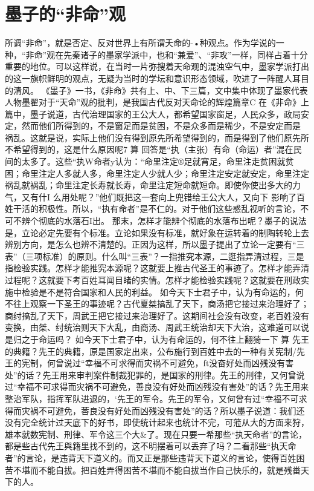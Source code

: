 {{\section{墨子的“非命”观	}
所调“非命”，就是否定、反对世界上有所谓夭命的-•种观点。作为学说的一种，“非命”观在先秦诸子的墨家学派中，也和“兼爱”、“非攻”一样，同样占着十分重要的地位。可以这样说，在当时一片弥搜着天命观的混浊空气中，墨家学派打出的这一旗帜鲜明的观点，无疑为当时的学坛和意识形态领域，吹进了一阵醒人耳目的清风。
《墨子》一书，《非命》共有上、中、下三篇，文中集中体现了墨家代表人物墨翟对于“天命”观的批判，是我国古代反对天命论的辉煌篇章C
在《非命》上篇中，墨子说道，古代治理国家的王公大人，都希望国家窗足，人民众多，政局安定，然而他们所得到的，不是窗足而是贫困，不是众多而是稀少，不是安定而是
祸乱。这就是说，实际上他们没有得到原先所希望得到的，而是得到了他们原先所不希望得到的，这是什么原因呢7
算
回答是“执（主张）有命（命运）者”混在民间的太多了。这些“执W命者y认为：“命里注定®足就宵足，命里注走贫困就贫困；命里注定人多就人多，命里注定人少就人少；命里注定安定就安定，命里注定祸乱就祸乱；命里注定长寿就长寿，命里注定短命就短命。即使你使出多大的力气，又有什I	么用处呢？”他们既把这一套向上兜错给王公大人，又向下
影响了百姓干活的积极性。所以，“执有命者”是不仁的。对于他们这些惑乱视听的言论，不可不辨个彻底的水落石I出。
那末，怎样才能辨个彻底的水落布出呢？墨子的说法是，立论必定先要有个标准。立论如果没有标准，就好象在运转着的制陶转轮上去辨别方向，是怎么也辨不清楚的。正因为这样，所以墨子提出了立论一定要有“三表”（三项标准）的原则。什么叫“三表”？一指推究本源，二逛指弄清过程，三是指检验实践。怎样才能推究本源呢？这就要上推古代圣王的事迹了。怎样才能弄清过程呢？这就要下考百姓耳闻目睹的实情。怎样才能检验实践呢？这就要在刑政实施中检验是不是符合国家和人民的利益。
如今天下士君子中，认为有命运的，何不往上观察一下圣王的事迹呢？古代夏桀搞乱了天下，商汤把它接过来治理好了；商纣搞乱了天下，周武王把它接过来治理好了。这期间社会没有改变，老百姓没有变换，由桀、纣统治则天下大乱，由商汤、周武王统治却天下大治，这难道可以说是归之于命运吗？
如今天下士君子中，认为有命运的，何不往上翻猗一下
算
先王的典籍？先王的典籍，原是国家定出来，公布施行到百姓中去的一种有关宪制/先王的宪制，何曾说过“幸福不可求得而灾祸不可避免，ft没奋好处而凶残没有害处”的话？先王用来审判案件制裁犯罪的，是国家的刑律。先王的刑律，又何曾说过“幸福不可求得而灾祸不可避免，善良没有好处而凶残没有害处”的话？先王用来整治军队，指挥军队进退的，‘先王的军令。先王的军令，又何曾有过“幸福不可求得而灾祸不可避免，莕良没有好处而凶残没有害处”的话？所以墨子说道：我们还没有完全统计过天底下的好书，即使统计起来也统计不完，可蒞从大的方面来狩，雄本就数宪制、刑律、军令这三个大&了。现在只要一希那些“执天命者”的言论，都是些古代先王與籍里找不到的，这不明摆着可以丢弃了吗？二看那些“执天命者”的言论，是违背天下道义的。而又正是那些违背天下道义的言论，使得百姓困苦不堪而不能自拔。把百姓弄得困苦不堪而不能自拔当作自己快乐的，就是残畨天下的人。
}}
